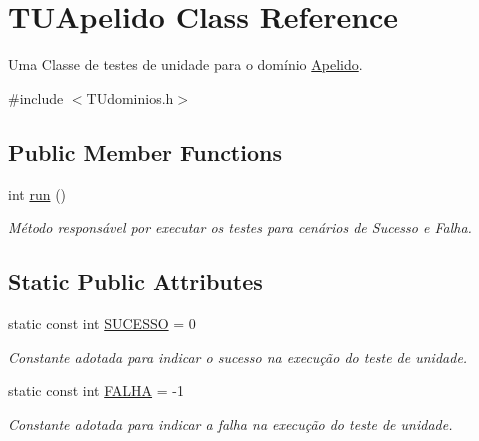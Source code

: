 \hypertarget{classTUApelido}{}\section{T\+U\+Apelido Class Reference}
\label{classTUApelido}


Uma Classe de testes de unidade para o domínio \hyperlink{classApelido}{Apelido}.  




{\ttfamily \#include $<$T\+Udominios.\+h$>$}

\subsection*{Public Member Functions}
\begin{DoxyCompactItemize}
\item 
int \hyperlink{classTUApelido_ab5aabaa60fd00030d047ef8bf6c55fec}{run} ()
\begin{DoxyCompactList}\small\item\em Método responsável por executar os testes para cenários de Sucesso e Falha. \end{DoxyCompactList}\end{DoxyCompactItemize}
\subsection*{Static Public Attributes}
\begin{DoxyCompactItemize}
\item 
\mbox{\label{classTUApelido_aa100f19a4867e7bf07c49161bb2efef0}} 
static const int \hyperlink{classTUApelido_aa100f19a4867e7bf07c49161bb2efef0}{S\+U\+C\+E\+S\+SO} = 0
\begin{DoxyCompactList}\small\item\em Constante adotada para indicar o sucesso na execução do teste de unidade. \end{DoxyCompactList}\item 
\mbox{\label{classTUApelido_afdc614cde9b44f65a445dbaf41142698}} 
static const int \hyperlink{classTUApelido_afdc614cde9b44f65a445dbaf41142698}{F\+A\+L\+HA} = -\/1
\begin{DoxyCompactList}\small\item\em Constante adotada para indicar a falha na execução do teste de unidade. \end{DoxyCompactList}\end{DoxyCompactItemize}



